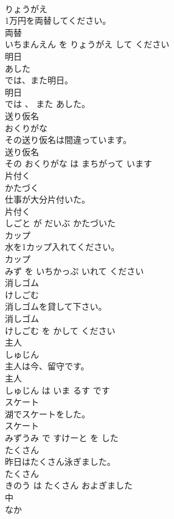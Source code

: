 \documentclass[8pt]{extreport}
\begin{document}
\begin{CJK}{UTF8}{min}
\\	りょうがえ			
\\	1万円を両替してください。	
\\	両替 
\\	いちまんえん を りょうがえ して ください			
\\	明日	
\\	あした			
\\	では、また明日。	
\\	明日 
\\	では 、 また あした。			
\\	送り仮名	
\\	おくりがな			
\\	その送り仮名は間違っています。	
\\	送り仮名 
\\	その おくりがな は まちがって います			
\\	片付く	
\\	かたづく			
\\	仕事が大分片付いた。	
\\	片付く 
\\	しごと が だいぶ かたづいた			
\\	カップ	
\\	水を1カップ入れてください。	
\\	カップ 
\\	みず を いちかっぷ いれて ください			
\\	消しゴム	
\\	けしごむ			
\\	消しゴムを貸して下さい。	
\\	消しゴム 
\\	けしごむ を かして ください			
\\	主人	
\\	しゅじん			
\\	主人は今、留守です。	
\\	主人 
\\	しゅじん は いま るす です			
\\	スケート	
\\	湖でスケートをした。	
\\	スケート 
\\	みずうみ で すけーと を した			
\\	たくさん	
\\	昨日はたくさん泳ぎました。	
\\	たくさん 
\\	きのう は たくさん およぎました			
\\	中	
\\	なか			

\end{CJK}
\end{document}
